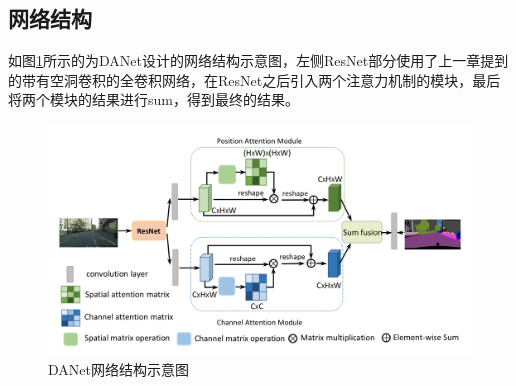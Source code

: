 \documentclass[cn]{elegantbook}
\begin{document}
\subsection{网络结构}
如图\ref{danet}所示的为DANet设计的网络结构示意图，左侧ResNet部分使用了上一章提到的带有空洞卷积的全卷积网络，在ResNet之后引入两个注意力机制的模块，最后将两个模块的结果进行sum，得到最终的结果。
\begin{figure}[!h]
	\centering
	\includegraphics[width=\textwidth]{images/danet}
	\caption{\label{danet}DANet网络结构示意图}
\end{figure}
\end{document}
